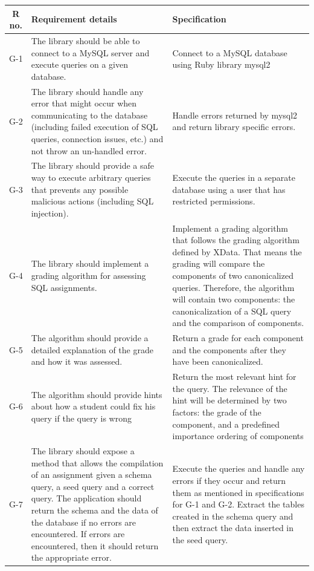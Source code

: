 \begin{tabularx}{\textwidth}{|c|Y|Y|}
  \hline
  \textbf{R no.} & \textbf{Requirement details} & \textbf{Specification} \\\hline
  \endhead
G-1 & The library should be able to connect to a MySQL server and execute queries on a given database. & Connect to a MySQL database using Ruby library mysql2 \\\hline
G-2 & The library should handle any error that might occur when communicating to the database (including failed execution of SQL queries, connection issues, etc.) and not throw an un-handled error. & Handle errors returned by mysql2 and return library specific errors. \\\hline
G-3 & The library should provide a safe way to execute arbitrary queries that prevents any possible malicious actions (including SQL injection). & Execute the queries in a separate database using a user that has restricted permissions. \\\hline
G-4 & The library should implement a grading algorithm for assessing SQL assignments. & Implement a grading algorithm that follows the grading algorithm defined by XData. That means the grading will compare the components of two canonicalized queries. Therefore, the algorithm will contain two components: the canonicalization of a SQL query and the comparison of components. \\\hline
G-5 & The algorithm should provide a detailed explanation of the grade and how it was assessed. & Return a grade for each component and the components after they have been canonicalized. \\\hline
G-6 & The algorithm should provide hints about how a student could fix his query if the query is wrong & Return the most relevant hint for the query. The relevance of the hint will be determined by two factors: the grade of the component, and a predefined importance ordering of components\\\hline
G-7 & The library should expose a method that allows the compilation of an assignment given a schema query, a seed query and a correct query. The application should return the schema and the data of the database if no errors are encountered. If errors are encountered, then it should return the appropriate error. & Execute the queries and handle any errors if they occur and return them as mentioned in specifications for G-1 and G-2. Extract the tables created in the schema query and then extract the data inserted in the seed query. \\\hline

\end{tabularx}
